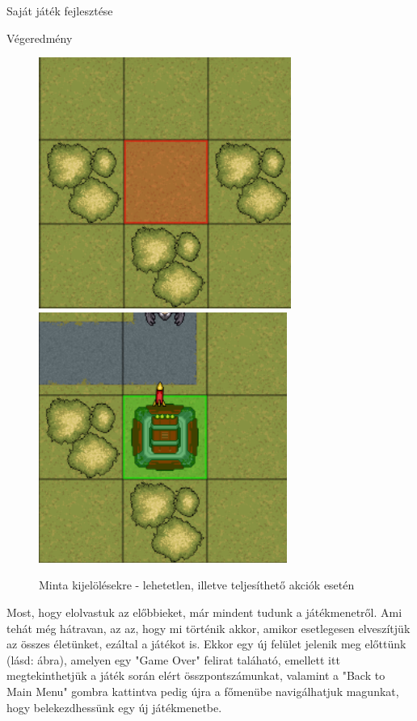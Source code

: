 \begin{MyChapter}{Saját játék fejlesztése}
\begin{MySection}{Végeredmény}
		\begin{figure}[H]
			\centering
			\includegraphics[scale=0.848]{kepek/jatekHasznalat/minta_rossz_kijeloles}
			\includegraphics[scale=0.85]{kepek/jatekHasznalat/minta_jo_kijeloles}
			\caption{Minta kijelölésekre - lehetetlen, illetve teljesíthető akciók esetén}
			\label{fig:jatekHasznalat:kijeloles_minta}
		\end{figure}
		
		
		Most, hogy elolvastuk az előbbieket, már mindent tudunk a játékmenetről. Ami tehát még hátravan, az az, hogy mi történik akkor, amikor esetlegesen elveszítjük az összes életünket, ezáltal a játékot is.
		Ekkor egy új felület jelenik meg előttünk (lásd:  ábra), amelyen egy "Game Over" felirat taláható, emellett itt megtekinthetjük a játék során elért összpontszámunkat, valamint a "Back to Main Menu" gombra kattintva pedig újra a főmenübe navigálhatjuk magunkat, hogy belekezdhessünk egy új játékmenetbe.
		

\end{MySection}
\end{MyChapter}
